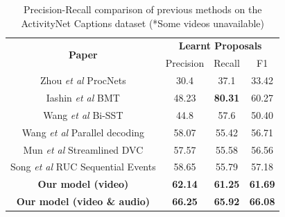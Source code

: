 \begin{table}[]
	\centering
	\begin{tabular}{|c|ccc|}
		\hline
		\multirow{2}{*}{\textbf{Paper}} & \multicolumn{3}{c|}{\textbf{Learnt Proposals}}                                             \\ \cline{2-4} 
		& \multicolumn{1}{c|}{Precision}      & \multicolumn{1}{c|}{Recall}         & F1             \\ \hline
		Zhou \textit{et al} \cite{zhou2017automatic} ProcNets                   & \multicolumn{1}{c|}{30.4}           & \multicolumn{1}{c|}{37.1}           & 33.42          \\ \hline
		Iashin \textit{et al} \cite{iashin2020better} BMT                             & \multicolumn{1}{c|}{48.23}          & \multicolumn{1}{c|}{\textbf{80.31}}          & 60.27          \\ \hline
		{Wang \textit{et al} \cite{wang2018bidirectional} Bi-SST}             & \multicolumn{1}{c|}{44.8}           & \multicolumn{1}{c|}{57.6}           & 50.40          \\ \hline
		Wang \textit{et al} \cite{wang2021endtoend} Parallel decoding                            & \multicolumn{1}{c|}{58.07}          & \multicolumn{1}{c|}{55.42}          & 56.71          \\ \hline
		{Mun \textit{et al} \cite{mun2019streamlined} Streamlined DVC}                 & \multicolumn{1}{c|}{57.57}          & \multicolumn{1}{c|}{55.58}          & 56.56          \\ \hline
		Song \textit{et al} \cite{songruc} RUC Sequential Events           & \multicolumn{1}{c|}{58.65}          & \multicolumn{1}{c|}{55.79}          & 57.18          \\ \hline
		\textbf{Our model (video)}              & \multicolumn{1}{c|}{\textbf{62.14}} & \multicolumn{1}{c|}{\textbf{61.25}} & \textbf{61.69} \\ \hline
		\textbf{Our model (video \& audio)}              & \multicolumn{1}{c|}{\textbf{66.25}} & \multicolumn{1}{c|}{\textbf{65.92}} & \textbf{66.08} \\ \hline
	\end{tabular}

	\centering
	\caption{Precision-Recall comparison of previous methods on the ActivityNet Captions dataset (*Some videos unavailable)}  \label{tab: precision-recall-comparison}
\end{table}


